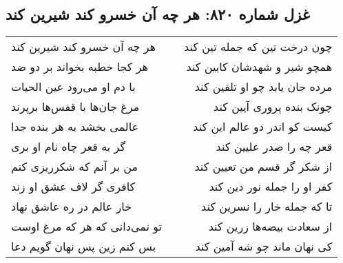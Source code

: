 \begin{center}
\section*{غزل شماره ۸۲۰: هر چه آن خسرو کند شیرین کند}
\label{sec:0820}
\begin{longtable}{l p{0.5cm} r}
هر چه آن خسرو کند شیرین کند
&&
چون درخت تین که جمله تین کند
\\
هر کجا خطبه بخواند بر دو ضد
&&
همچو شیر و شهدشان کابین کند
\\
با دم او می‌رود عین الحیات
&&
مرده جان یابد چو او تلقین کند
\\
مرغ جان‌ها با قفس‌ها برپرند
&&
چونک بنده پروری آیین کند
\\
عالمی بخشد به هر بنده جدا
&&
کیست کو اندر دو عالم این کند
\\
گر به قعر چاه نام او بری
&&
قعر چه را صدر علیین کند
\\
من بر آنم که شکرریزی کنم
&&
از شکر گر قسم من تعیین کند
\\
کافری گر لاف عشق او زند
&&
کفر او را جمله نور دین کند
\\
خار عالم در ره عاشق نهاد
&&
تا که جمله خار را نسرین کند
\\
تو نمی‌دانی که هر که مرغ اوست
&&
از سعادت بیضه‌ها زرین کند
\\
بس کنم زین پس نهان گویم دعا
&&
کی نهان ماند چو شه آمین کند
\\
\end{longtable}
\end{center}
